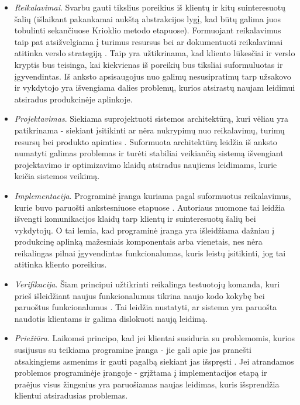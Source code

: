 \documentclass{VUMIFPSkursinis}
\begin{document}
\begin{itemize}
  \item \textit{Reikalavimai}. Svarbu gauti tikslius poreikius iš klientų ir kitų suinteresuotų šalių (išlaikant pakankamai aukštą abstrakcijos lygį, kad būtų galima juos tobulinti sekančiuose Krioklio metodo etapuose). Formuojant reikalavimus taip pat atsižvelgiama į turimus resursus bei ar dokumentuoti reikalavimai atitinka verslo strategiją \cite{SaltKetvirtas}. Taip yra užtikrinama, kad kliento lūkesčiai ir verslo kryptis bus teisinga, kai kiekvienas iš poreikių bus tiksliai suformuluotas ir įgyvendintas. Iš anksto apsisaugojus nuo galimų nesusipratimų tarp užsakovo ir vykdytojo yra išvengiama dalies problemų, kurios atsirastų naujam leidimui atsiradus produkcinėje aplinkoje.

  \item \textit{Projektavimas}. Siekiama suprojektuoti sistemos architektūrą, kuri vėliau yra patikrinama - siekiant įsitikinti ar nėra nukrypimų nuo reikalavimų, turimų resursų bei produkto apimties \cite{SaltKetvirtas}. Suformuota architektūrą leidžia iš anksto numatyti galimas problemas ir turėti stabiliai veikiančią sistemą išvengiant projektavimo ir optimizavimo klaidų atsiradus naujiems leidimams, kurie keičia sistemos veikimą. 
  
  \item \textit{Implementacija}. Programinė įranga kuriama pagal suformuotus reikalavimus, kurie buvo paruošti ankstesniuose etapuose \cite{SaltPenktas}.  Autoriaus nuomone tai leidžia išvengti komunikacijos klaidų tarp klientų ir suinteresuotų šalių bei vykdytojų. O tai lemia, kad programinė įranga yra išleidžiama dažniau į produkcinę aplinką mažesniais komponentais arba vienetais, nes nėra reikalingas pilnai įgyvendintas funkcionalumas, kuris leistų įsitikinti, jog tai atitinka kliento poreikius.
  
  \item \textit{Verifikacija}. Šiam principui užtikrinti reikalinga testuotojų komanda, kuri prieš išleidžiant naujus funkcionalumus tikrina naujo kodo kokybę bei paruoštus funkcionalumus \cite{SaltKetvirtas}. Tai leidžia nustatyti, ar sistema yra paruošta naudotis klientams ir galima dislokuoti naują leidimą.
  
  \item \textit{Priežiūra}. Laikomsi principo, kad jei klientai susiduria su problemomis, kurios susijusus su teikiama programine įranga - jie gali apie jas pranešti atsakingiems asmenims ir gauti pagalbą siekiant jas išspręsti \cite{SaltKetvirtas}. Jei atrandamos problemos programinėje įrangoje - grįžtama į implementacijos etapą ir praėjus visus žingsnius yra paruošiamas naujas leidimas, kuris išsprendžia klientui atsiradusias problemas.
\end{itemize}
\end{document}
